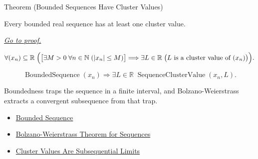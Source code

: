 
\begin{theorembox}{Theorem (Bounded Sequences Have Cluster Values)}
\begin{theorem}
\label{thm:bounded-sequences-have-cluster-values}
Every bounded real sequence has at least one cluster value.

\smallskip
\noindent
\hyperref[prf:bounded-sequences-have-cluster-values]{\textit{Go to proof.}}
\end{theorem}
\end{theorembox}

\begin{remark*}
\[
\forall (x_n)\subseteq\mathbb{R}\;
\Bigl(
  \bigl[\exists M>0\;\forall n\in\mathbb{N}\;(|x_n|\le M)\bigr]
  \Longrightarrow
  \exists L\in\mathbb{R}\;
  \bigl(L\text{ is a cluster value of }(x_n)\bigr)
\Bigr).
\]
\end{remark*}

\begin{remark*}
\[
\operatorname{BoundedSequence}(x_n)
\Longrightarrow
\exists L\in\mathbb{R}\;\operatorname{SequenceClusterValue}(x_n,L).
\]
\end{remark*}

\begin{remark*}[Interpretation]
Boundedness traps the sequence in a finite interval, and
Bolzano-Weierstrass extracts a convergent subsequence from that trap.
\end{remark*}

\begin{remark*}[Dependencies]\hfill
\begin{itemize}
  \item \hyperref[def:bounded-sequence]{Bounded Sequence}
  \item \hyperref[thm:bolzano-weierstrass-sequences]{Bolzano-Weierstrass Theorem for Sequences}
  \item \hyperref[thm:cluster-values-are-subsequential-limits]{Cluster Values Are Subsequential Limits}
\end{itemize}
\end{remark*}


